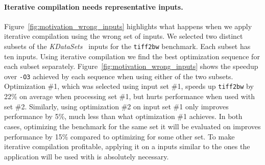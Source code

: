     \paragraph{Iterative compilation needs representative inputs.}

    Figure~\ref{fig:motivation_wrong_inputs} highlights what happens when we apply iterative compilation using the wrong set of inputs. We
    selected two distinct subsets of the \textit{KDataSets}~\cite{chen10,chen12a} inputs for the \texttt{tiff2bw} benchmark. Each subset
    has ten inputs. Using iterative compilation we find the best optimization sequence for each subset separately.
    Figure~\ref{fig:motivation_wrong_inputs} shows the speedup over \texttt{-O3} achieved by each sequence when using either of the two
    subsets. Optimization \#1, which was selected using input set \#1, speeds up \texttt{tiff2bw} by 22\% on average when processing set
    \#1, but hurts performance when used with set \#2. Similarly, using optimization \#2 on input set \#1 only improves performance by 5\%,
    much less than what optimization \#1 achieves. In both cases, optimizing the benchmark for the same set it will be evaluated on
    improves performance by 15\% compared to optimizing for some other set. To make iterative compilation profitable, applying it on a
    inputs similar to the ones the application will be used with is absolutely necessary.


